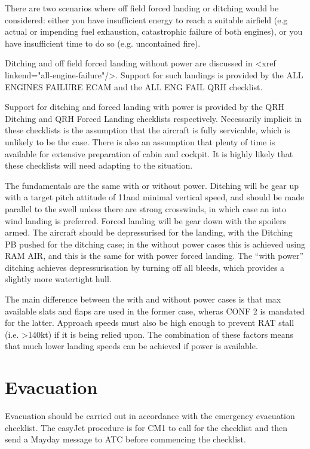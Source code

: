 \documentclass[a5paper,11pt,twoside]{book}
\newcommand{\multicite}[1]{
  \nopagebreak
  \noindent{\footnotesize\color{blue}{[ #1 ]}}
}
\begin{document}
There are two scenarios where off field forced landing or ditching would be
considered: either you have insufficient energy to reach a suitable airfield
(e.g actual or impending fuel exhaustion, catastrophic failure of both engines),
or you have insufficient time to do so (e.g. uncontained fire).

Ditching and off field forced landing without power are discussed in <xref
linkend="all-engine-failure"/>. Support for such landings is provided by the ALL
ENGINES FAILURE ECAM and the ALL ENG FAIL QRH checklist.

Support for ditching and forced landing with power is provided by the QRH
Ditching and QRH Forced Landing checklists respectively. Necessarily implicit in
these checklists is the assumption that the aircraft is fully servicable, which
is unlikely to be the case. There is also an assumption that plenty of time is
available for extensive preparation of cabin and cockpit. It is highly likely
that these checklists will need adapting to the situation.

The fundamentals are the same with or without power. Ditching will be gear up
with a target pitch attitude of 11\textdegree{ }and minimal vertical speed, and should be
made parallel to the swell unless there are strong crosswinds, in which case an
into wind landing is preferred. Forced landing will be gear down with the
spoilers armed. The aircraft should be depressurised for the landing, with the
Ditching PB pushed for the ditching case; in the without power cases this is
achieved using RAM AIR, and this is the same for with power forced landing. The
``with power'' ditching achieves depressurisation by turning off all bleeds, which
provides a slightly more watertight hull.

The main difference between the with and without power cases is that max
available slats and flaps are used in the former case, wheras CONF 2 is mandated
for the latter. Approach speeds must also be high enough to prevent RAT stall
(i.e. >140kt) if it is being relied upon. The combination of these factors means
that much lower landing speeds can be achieved if power is available.

\multicite{QRH~AEP.MISC}

\section{Evacuation}

Evacuation should be carried out in accordance with the emergency evacuation
checklist. The easyJet procedure is for CM1 to call for the checklist and then
send a Mayday message to ATC before commencing the checklist.
\end{document}
